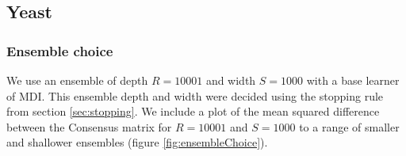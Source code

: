 \documentclass{bioinfo}
\begin{document}

%
%




\subsection{Yeast}
\subsubsection{Ensemble choice}
We use an ensemble of depth $R=10001$ and width $S=1000$ with a base learner of MDI. This ensemble depth and width were decided using the stopping rule from section \ref{sec:stopping}. We include 
a plot of the mean squared difference between the Consensus matrix for $R=10001$ and $S=1000$ to a range of smaller and shallower ensembles (figure \ref{fig:ensembleChoice}).
\end{document}

